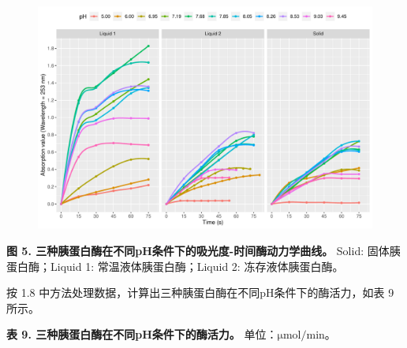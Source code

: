 \documentclass[11pt,UTF8]{ctexart}
\newenvironment{unicaption}{\noindent\small}{\normalsize}
\begin{document}
        \begin{figure}[H] %
            \centering %
            \includegraphics[width=1.0\textwidth]{pH_plot_2.pdf} %
        \end{figure}
    
        \begin{unicaption}
            \textbf{图 5. 三种胰蛋白酶在不同pH条件下的吸光度-时间酶动力学曲线。} Solid: 固体胰蛋白酶；Liquid 1: 常温液体胰蛋白酶；Liquid 2: 冻存液体胰蛋白酶。
        \end{unicaption}

        按 1.8 中方法处理数据，计算出三种胰蛋白酶在不同pH条件下的酶活力，如表 9 所示。

        \begin{unicaption}
            \textbf{表 9. 三种胰蛋白酶在不同pH条件下的酶活力。} 单位：\(\mathrm{\mu mol/min}\)。
        \end{unicaption}
\end{document}
